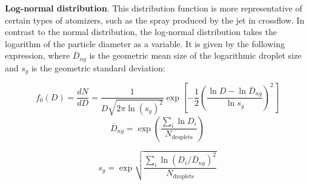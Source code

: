 \textbf{Log-normal distribution}. This distribution function is more representative of certain types of atomizers, such as the spray produced by the jet in crossflow. In contrast to the normal distribution, the log-normal distribution takes the logarithm of the particle diameter as a variable. It is given by the following expression, where $\overline{D}_{ng}$ is the geometric mean size of the logarithmic droplet size and $s_g$ is the geometric standard deviation:

\begin{equation}
 f_0 \left( D \right) = \frac{d N}{d D} =  \frac{1}{D  \sqrt{2 \pi \ln \left( s_g \right)^2}} \exp \left[ - \frac{1}{2 } \left( \frac{\ln D - \ln \overline{D}_{ng}}{\ln s_g}   \right)^2 \right]
\end{equation}
%
\begin{equation}
\overline{D}_{ng} = \exp \left(  \frac{\sum_i \ln D_i }{N_\mathrm{droplets}} \right) 
\end{equation}

\begin{equation}
s_g = \exp \sqrt{  \frac{\sum_i \ln \left( D_i / \overline{D}_{ng} \right) ^2 }{N_\mathrm{droplets}} }
\end{equation}




